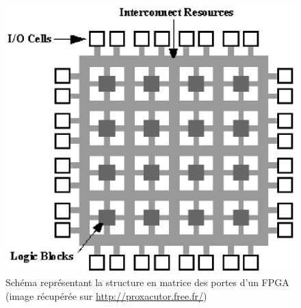 \begin{figure}
\begin{center}
\includegraphics[scale=0.5]{porte.eps}
\end{center}
\caption{Schéma représentant la structure en matrice des portes d'un FPGA (image récupérée sur \url{http://proxacutor.free.fr/})}
\end{figure}

